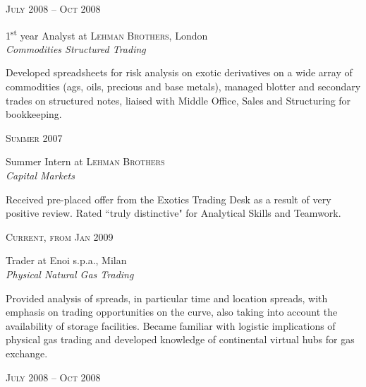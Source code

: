 \documentclass[10pt]{article} %
\begin{document}
{\begin{minipage}[t]{0.5\textwidth}
{\raggedleft\textsc{July 2008 -- Oct 2008}\par}

{\raggedright\large 1\textsuperscript{st} year Analyst at \textsc{Lehman Brothers}, London\\
\textit{Commodities Structured Trading}\\[5pt]}

\normalsize{Developed spreadsheets for risk analysis on exotic derivatives on a wide array of commodities (ags, oils, precious and base metals), managed blotter and secondary trades on structured notes, liaised with Middle Office, Sales and Structuring for bookkeeping.}\\


{\raggedleft\textsc{Summer 2007}\par}

{\raggedright\large Summer Intern at \textsc{Lehman Brothers}\\
\textit{Capital Markets}\\[5pt]}

\normalsize{Received pre-placed offer from the Exotics Trading Desk as a result of very positive review. Rated ``truly distinctive" for Analytical Skills and Teamwork.}\\


{\raggedleft\textsc{Current, from Jan 2009}\par}

{\raggedright\large Trader at Enoi s.p.a., Milan\\
\textit{Physical Natural Gas Trading}\\[5pt]}

\normalsize{Provided analysis of spreads, in particular time and location spreads, with emphasis on trading opportunities on the curve, also taking into account the availability of storage facilities. Became familiar with logistic implications of physical gas trading and developed knowledge of continental virtual hubs for gas exchange.}\\


{\raggedleft\textsc{July 2008 -- Oct 2008}\par}


\end{minipage}}
\end{document}
